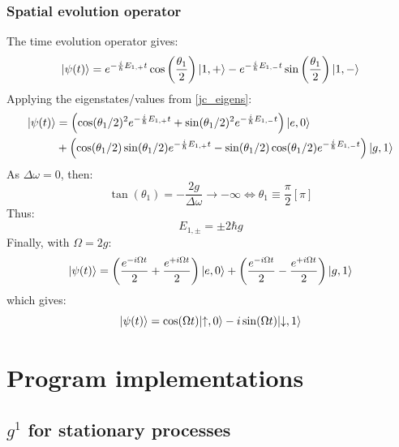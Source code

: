 \documentclass[10pt]{report}
\DeclarePairedDelimiter\ket{\lvert}{\rangle}
\begin{document}
\subsection{Spatial evolution operator}

The time evolution operator gives:
\begin{equation}
\ket{\psi(t)} = e^{-\frac{i}{\hbar}E_{1,+}t} \cos\left(\frac{\theta_{1}}{2}\right) \ket{1, +} - e^{-\frac{i}{\hbar}E_{1,-}t} \sin\left(\frac{\theta_{1}}{2}\right) \ket{1, -}
\end{equation}
Applying the eigenstates/values from \ref{jc_eigens}:
\begin{align}
\begin{split}
\ket{\psi(t)} &= \left( \cos(\theta_1/2)^2 e^{-\frac{i}{\hbar}E_{1,+}t} + \sin(\theta_1/2)^2 e^{-\frac{i}{\hbar}E_{1,-}t} \right) \ket{e, 0} \\
&+ \left( \cos(\theta_1/2) \sin(\theta_1/2) e^{-\frac{i}{\hbar}E_{1,+}t} - \sin(\theta_1/2) \cos(\theta_1/2) e^{-\frac{i}{\hbar}E_{1,-}t} \right) \ket{g, 1}
\end{split}
\end{align}
As $\Delta\omega = 0$, then:
\begin{equation}
\tan(\theta_1) = -\frac{2g}{\Delta\omega} \rightarrow -\infty \Leftrightarrow \theta_1 \equiv \frac{\pi}{2} \left[\pi\right]
\end{equation}
Thus:
\begin{equation}
E_{1,\pm} = \pm 2\hbar g
\end{equation}
Finally, with $\Omega = 2g$:
\begin{equation}
\ket{\psi(t)} = \left( \frac{e^{-i\Omega t}}{2} + \frac{e^{+i\Omega t}}{2} \right) \ket{e, 0} + \left( \frac{e^{-i\Omega t}}{2} - \frac{e^{+i\Omega t}}{2} \right) \ket{g, 1}
\end{equation}
which gives:
\begin{equation}
\ket{\psi(t)} = \cos(\Omega t) \ket{\uparrow, 0} - i \sin(\Omega t) \ket{\downarrow, 1}
\end{equation}

\chapter{Program implementations}

\section{$g^1$ for stationary processes}
\end{document}
